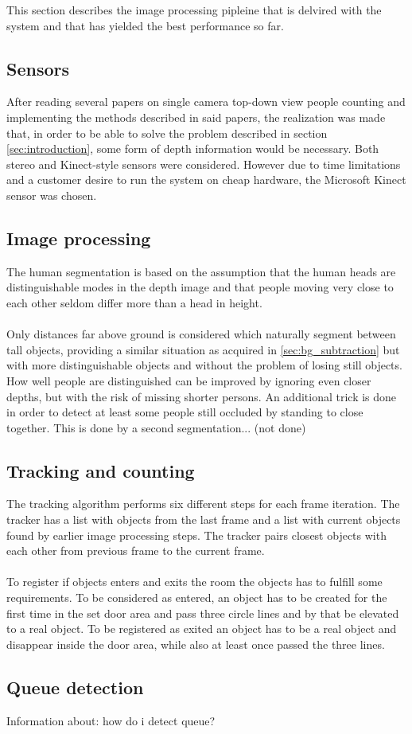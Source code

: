This section describes the image processing pipleine that is delvired with the system and that has yielded the best performance so far.

\subsection{Sensors}
After reading several papers on single camera top-down view people counting and implementing the methods described in said papers, the realization was made that, in order to be able to solve the problem described in section \ref{sec:introduction}, some form of depth information would be necessary. Both stereo and Kinect-style sensors were considered. However due to time limitations and a customer desire to run the system on cheap hardware, the Microsoft Kinect sensor was chosen.

\subsection{Image processing}
The human segmentation is based on the assumption that the human heads are distinguishable modes in the depth image and that people moving very close to each other seldom differ more than a head in height.\\
\\
Only distances far above ground is considered which naturally segment between tall objects, providing a similar situation as acquired in \ref{sec:bg_subtraction} but with more distinguishable objects and without the problem of losing still objects. How well people are distinguished can be improved by ignoring even closer depths, but with the risk of missing shorter persons. An additional trick is done in order to detect at least some people still occluded by standing to close together. This is done by a second segmentation... (not done)

\subsection{Tracking and counting}
The tracking algorithm performs six different steps for each frame iteration. The tracker has a list with objects from the last frame and a list with current objects found by earlier image processing steps. The tracker pairs closest objects with each other from previous frame to the current frame. \\ \\
To register if objects enters and exits the room the objects has to fulfill some requirements. To be considered as entered, an object has to be created for the first time in the set door area and pass three circle lines and by that be elevated to a real object. To be registered as exited an object has to be a real object and disappear inside the door area, while also at least once passed the three lines.

\subsection{Queue detection}
Information about: how do i detect queue?

